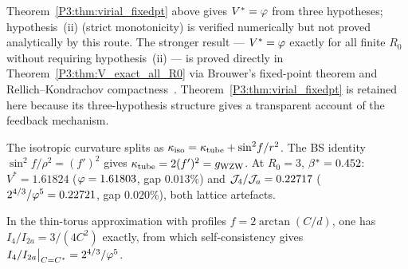 \begin{remark}
\label{P3:rem:relation_to_V_exact}
Theorem~\ref{P3:thm:virial_fixedpt} above gives $V^*=\varphi$ from three
hypotheses; hypothesis~(ii) (strict monotonicity) is verified numerically
but not proved analytically by this route.
The stronger result --- $V^*=\varphi$ exactly for all finite $R_0$ without
requiring hypothesis~(ii) --- is proved directly in
Theorem~\ref{P3:thm:V_exact_all_R0} via Brouwer's fixed-point theorem and
Rellich--Kondrachov compactness~\cite{Evans2010}.
Theorem~\ref{P3:thm:virial_fixedpt} is retained here because its three-hypothesis
structure gives a transparent account of the feedback mechanism.
\end{remark}

\begin{remark}
\label{P3:rem:kappa_wzw_preview}
The isotropic curvature splits as $\kappa_{\mathrm{iso}} = \kappa_{\mathrm{tube}} + \sin^2\!f/r^2$.
The BS identity $\sin^2\!f/\rho^2 = (f')^2$ gives $\kappa_{\mathrm{tube}} = 2(f')^2 = g_{\mathrm{WZW}}$.
At $R_0=3$, $\beta^{*}=0.452$: $V^* = 1.61824$ ($\varphi=1.61803$, gap $0.013\%$) and
$\mathcal{J}_4/\mathcal{J}_a = 0.22717$ ($2^{4/3}/\varphi^5=0.22721$, gap $0.020\%$), both lattice artefacts.
\end{remark}

\begin{theorem}
\label{P3:thm:lsc_1d}
In the thin-torus approximation with profiles $f = 2\arctan(C/d)$,
one has $I_4/I_{2a} = 3/(4C^2)$ exactly, from which self-consistency
gives $I_4/I_{2a}\big|_{C=C^*} = 2^{4/3}/\varphi^5$.
\end{theorem}

